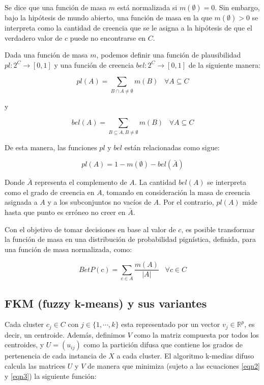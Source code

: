 Se dice que una función de masa $m$ está normalizada si $m(\emptyset) = 0$. Sin embargo, bajo la hipótesis de mundo abierto, una función de masa en la que $m(\emptyset) > 0$ se interpreta como la cantidad de creencia que se le asigna a la hipótesis de que el verdadero valor de $c$ puede no encontrarse en $C$.

Dada una función de masa $m$, podemos definir una función de plausibilidad $pl:2^C \rightarrow [0,1]$ y una función de creencia $bel: 2^C \rightarrow [0,1]$ de la siguiente manera:

\begin{equation}
pl(A) = \sum_{B \cap A \neq \emptyset} m(B) \;\;\; \forall A \subseteq C
\label{eqn4}
\end{equation}

y 

\begin{equation}
bel(A) = \sum_{B \subseteq A, B \neq \emptyset} m(B) \;\;\; \forall A \subseteq C
\label{eqn5}
\end{equation}

De esta manera, las funciones $pl$ y $bel$ están relacionadas como sigue:

\begin{equation}
pl(A) = 1 - m(\emptyset) - bel(\bar{A})
\label{eqn6}
\end{equation}

Donde $\bar{A}$ representa el complemento de $A$.  La cantidad $bel(A)$ se interpreta como el grado de creencia en $A$, tomando en consideración la masa de creencia asignada a $A$ y a los subconjuntos no vacíos de $A$. Por el contrario, $pl(A)$ mide hasta que punto es erróneo no creer en $\bar{A}$.

Con el objetivo de tomar decisiones en base al valor de $c$, es posible transformar la función de masa en una distribución de probabilidad pignística, definida, para una función de masa normalizada, como:

\begin{equation}
BetP(c) = \sum_{c \in A} \frac{m(A)}{|A|} \;\;\; \forall c \in C
\label{eqn7}
\end{equation}

\subsection{FKM (fuzzy k-means) y sus variantes}

Cada cluster $c_j \in C$ con $j \in \{1,\cdots,k\}$ esta representado por un vector $v_j \in \mathbb{R}^p$, es decir, un centroide. Además, definimos $V$ como la matriz compuesta por todos los centroides, y $U = (u_{ij})$ como la partición difusa que contiene los grados de pertenencia de cada instancia de $X$ a cada cluster. El algoritmo k-medias difuso calcula las matrices $U$ y $V$ de manera que minimiza (sujeto a las ecuaciones \ref{eqn2} y \ref{eqn3}) la siguiente función:

